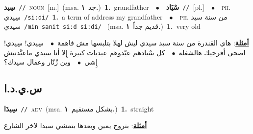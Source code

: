\documentclass[10pt,a4paper,twoside]{article} %
\begin{document}
\begin{multicols}{2}
{\setlength\topsep{0pt}\textbf{\foreignlanguage{arabic}{سِيد}}\ {\color{gray}\texttt{//}\color{black}}\ \textsc{noun}\ [m.]\ \color{gray}(msa. \foreignlanguage{arabic}{جد}~\foreignlanguage{arabic}{\textbf{١.}})\color{black}\ \textbf{1.}~grandfather\ \ $\bullet$\ \ \setlength\topsep{0pt}\textbf{\foreignlanguage{arabic}{سْيَاد}}\ {\color{gray}\texttt{//}\color{black}}\ [pl.]\ \ $\bullet$\ \ \textsc{ph.} \color{gray} \foreignlanguage{arabic}{سِيدي}\color{black}\ {\color{gray}\texttt{/{\sffamily siːdi}/}\color{black}}\ \textbf{1.}~a term of address my grandfather\ \ $\bullet$\ \ \textsc{ph.} \color{gray} \foreignlanguage{arabic}{من سنة سيد سيدي}\color{black}\ {\color{gray}\texttt{/{\sffamily min sanit siːd siːdi}/}\color{black}}\ \color{gray} (msa. \foreignlanguage{arabic}{قديم جداً}~\foreignlanguage{arabic}{\textbf{١.}})\color{black}\ \textbf{1.}~very old\  \begin{flushright}\color{gray}\foreignlanguage{arabic}{\textbf{\underline{\foreignlanguage{arabic}{أمثلة}}}: هاي القندرة من سنة سيد سيدي ليش لهلا بتلبسها مش فاهمة\ $\bullet$\ \  سِيدي! سِيدي! اصحى أفرجيك هالشغلة\ $\bullet$\ \  كل سْيادهم عيّدوهم عيديات كبيرة إِلا أنا سيدي ماعيَّدنيش إِشي\ $\bullet$\ \  وين زَُنّار وعقال سيدك؟}\end{flushright}\color{black}} \vspace{2mm}

\vspace{-3mm}
\subsection*{\color{blue}\foreignlanguage{arabic}{س.ي.د.ا}\color{blue}{ (ntws)}} 

{\setlength\topsep{0pt}\textbf{\foreignlanguage{arabic}{سِيدَا}}\ {\color{gray}\texttt{//}\color{black}}\ \textsc{adv}\ \color{gray}(msa. \foreignlanguage{arabic}{بشكل مستقيم}~\foreignlanguage{arabic}{\textbf{١.}})\color{black}\ \textbf{1.}~straight\  \begin{flushright}\color{gray}\foreignlanguage{arabic}{\textbf{\underline{\foreignlanguage{arabic}{أمثلة}}}: بتروح يمين وبعدها بتمشي سيدا لاخر الشارع}\end{flushright}\color{black}} \vspace{2mm}


\end{multicols}
\end{document}
